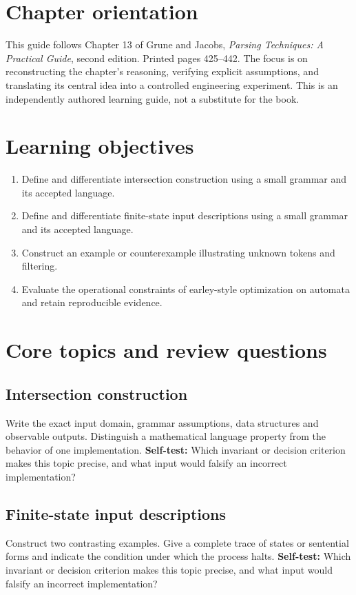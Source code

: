 \documentclass[11pt,letterpaper]{article}
\begin{document}
\makedoctitle\makedocsummary
\tableofcontents\clearpage
\section{Chapter orientation}
This guide follows Chapter 13 of Grune and Jacobs, \emph{Parsing Techniques: A Practical Guide}, second edition. Printed pages 425--442. The focus is on reconstructing the chapter's reasoning, verifying explicit assumptions, and translating its central idea into a controlled engineering experiment. This is an independently authored learning guide, not a substitute for the book.
\section{Learning objectives}
\begin{enumerate}
\item Define and differentiate intersection construction using a small grammar and its accepted language.
\item Define and differentiate finite-state input descriptions using a small grammar and its accepted language.
\item Construct an example or counterexample illustrating unknown tokens and filtering.
\item Evaluate the operational constraints of earley-style optimization on automata and retain reproducible evidence.
\end{enumerate}
\section{Core topics and review questions}
\subsection{Intersection construction}
Write the exact input domain, grammar assumptions, data structures and observable outputs. Distinguish a mathematical language property from the behavior of one implementation.
\textbf{Self-test:} Which invariant or decision criterion makes this topic precise, and what input would falsify an incorrect implementation?
\subsection{Finite-state input descriptions}
Construct two contrasting examples. Give a complete trace of states or sentential forms and indicate the condition under which the process halts.
\textbf{Self-test:} Which invariant or decision criterion makes this topic precise, and what input would falsify an incorrect implementation?
\end{document}
